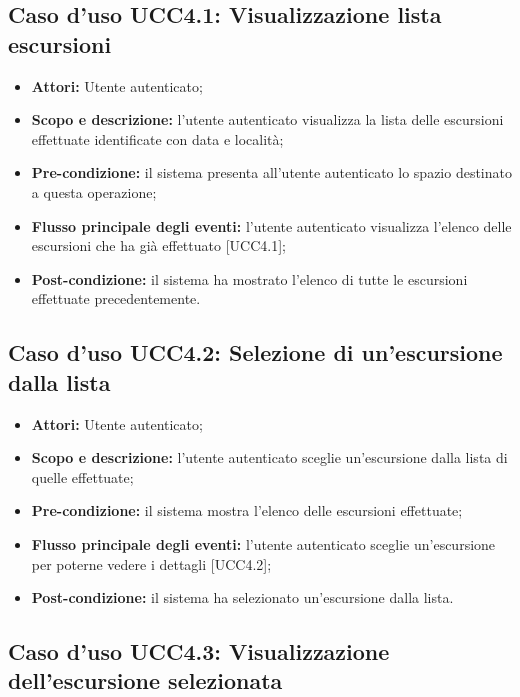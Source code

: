 \subsection{Caso d'uso UCC4.1: Visualizzazione lista escursioni}

\begin{itemize}
\item \textbf{Attori:} Utente autenticato;
\item \textbf{Scopo e descrizione:} l'utente autenticato visualizza la lista delle escursioni effettuate identificate con data e località;
\item \textbf{Pre-condizione:} il sistema presenta all'utente autenticato lo spazio destinato a questa operazione;
\item \textbf{Flusso principale degli eventi:} l'utente autenticato visualizza l'elenco delle escursioni che ha già effettuato [UCC4.1];
\item \textbf{Post-condizione:} il sistema ha mostrato l'elenco di tutte le escursioni effettuate precedentemente.
\end{itemize}

\subsection{Caso d'uso UCC4.2: Selezione di un'escursione dalla lista}

\begin{itemize}
\item \textbf{Attori:} Utente autenticato;
\item \textbf{Scopo e descrizione:} l'utente autenticato sceglie un'escursione dalla lista di quelle effettuate;
\item \textbf{Pre-condizione:} il sistema mostra l'elenco delle escursioni effettuate;
\item \textbf{Flusso principale degli eventi:} l'utente autenticato sceglie un'escursione per poterne vedere i dettagli [UCC4.2];
\item \textbf{Post-condizione:} il sistema ha selezionato un'escursione dalla lista.
\end{itemize}

\subsection{Caso d'uso UCC4.3: Visualizzazione dell'escursione selezionata}

